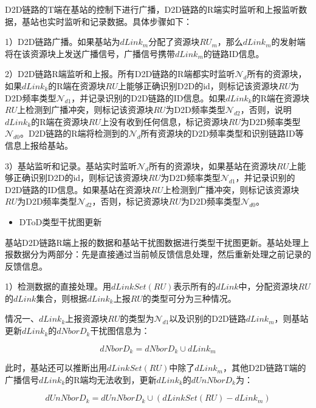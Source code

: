 \documentclass[figurelist,tablelist,algorithmlist,nomlist,masters]{seuthesix}
\begin{document}
	D2D链路的T端在基站的控制下进行广播，D2D链路的R端实时监听和上报监听数据，基站也实时监听和记录数据。具体步骤如下：
	
	1）D2D链路广播。如果基站为$dLink_m$分配了资源块$RU_m$，那么$dLink_m$的发射端将在该资源块上发送广播信号，广播信号携带$dLink_m$的链路ID信息。
	
	2）D2D链路R端监听和上报。所有D2D链路的R端都实时监听$\mathcal{N}_d$所有的资源块，如果$dLink_k$的R端在资源块$RU$上能够正确识别D2D的id，则标记该资源块$RU$为D2D频率类型$\mathcal{N}_{d1}$，并记录识别的D2D链路的ID信息。如果$dLink_k$的R端在资源块$RU$上检测到广播冲突，则标记该资源块$RU$为D2D频率类型$\mathcal{N}_{d2}$，否则，说明$dLink_k$的R端在资源块$RU$上没有收到任何信息，标记资源块$RU$为D2D频率类型$\mathcal{N}_{d0}$。D2D链路的R端将检测到的$\mathcal{N}_d$所有资源块的D2D频率类型和识别链路ID等信息上报给基站。
	
	3）基站监听和记录。基站实时监听$\mathcal{N}_d$所有的资源块，如果基站在资源块$RU$上能够正确识别D2D的id，则标记该资源块$RU$为D2D频率类型$\mathcal{N}_{d1}$，并记录识别的D2D链路的ID信息。如果基站在资源块$RU$上检测到广播冲突，则标记该资源块$RU$为D2D频率类型$\mathcal{N}_{d2}$，否则，标记资源块$RU$为D2D频率类型$\mathcal{N}_{d0}$。
	
	
	
	\begin{itemize}
		\item DToD类型干扰图更新
	\end{itemize}
	
	基站D2D链路R端上报的数据和基站干扰图数据进行类型干扰图更新。基站处理上报数据分为两部分：先是直接通过当前帧反馈信息处理，然后重新处理之前记录的反馈信息。
	
	1）检测数据的直接处理。用$dLinkSet(RU)$表示所有的$dLink$中，分配资源块$RU$的$dLink$集合，则根据$dLink_k$上报$RU$的类型可分为三种情况。
	
	情况一、$dLink_k$上报资源块$RU$的类型为$\mathcal{N}_{d1}$以及识别的D2D链路$dLink_m$，则基站更新$dLink_k$的$dNborD_k$干扰图信息为：
	
	\begin{equation}\label{eq2.12}
	dNborD_k = dNborD_k \cup dLink_m
	\end{equation}
	
	此时，基站还可以推断出用$dLinkSet(RU)$中除了$dLink_m$，其他D2D链路T端的广播信号$dLink_k$的R端均无法收到，更新$dLink_k$的$dUnNborD_k$为：
	
	\begin{equation}\label{eq2.13}
	dUnNborD_k = dUnNborD_k \cup (dLinkSet(RU) - dLink_m)
	\end{equation}
	
\end{document}
